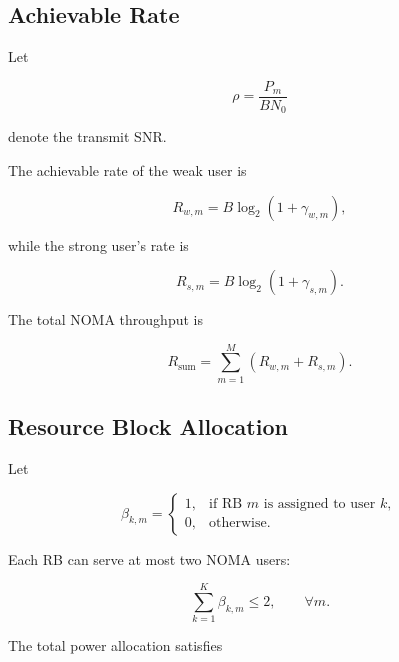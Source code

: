 \documentclass[conference]{IEEEtran}
\begin{document}
\subsection{Achievable Rate}

Let

\begin{equation}
\rho=\frac{P_m}{B N_0}
\end{equation}

denote the transmit SNR.

The achievable rate of the weak user is

\begin{equation}
R_{w,m}
=
B\log_2
\left(
1+\gamma_{w,m}
\right),
\end{equation}

while the strong user's rate is

\begin{equation}
R_{s,m}
=
B\log_2
\left(
1+\gamma_{s,m}
\right).
\end{equation}

The total NOMA throughput is

\begin{equation}
R_{\mathrm{sum}}
=
\sum_{m=1}^{M}
\left(
R_{w,m}+R_{s,m}
\right).
\end{equation}

\subsection{Resource Block Allocation}

Let

\begin{equation}
\beta_{k,m}
=
\begin{cases}
1,& \text{if RB }m\text{ is assigned to user }k,\\
0,& \text{otherwise}.
\end{cases}
\end{equation}

Each RB can serve at most two NOMA users:

\begin{equation}
\sum_{k=1}^{K}
\beta_{k,m}
\le 2,
\qquad \forall m.
\end{equation}

The total power allocation satisfies
\end{document}
